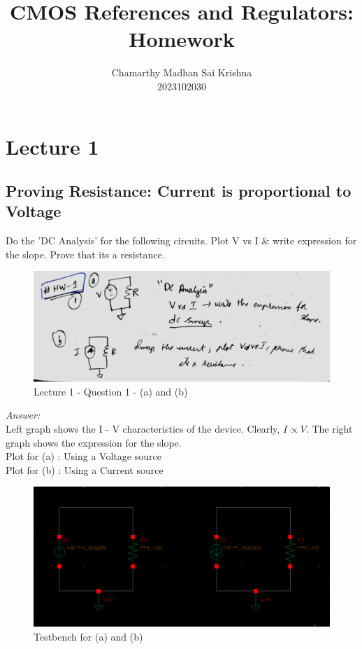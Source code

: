 \documentclass[a4paper]{article}
\title{\textbf{CMOS References and Regulators: Homework}}
\author{Chamarthy Madhan Sai Krishna\\2023102030}
\begin{document}
\maketitle

\tableofcontents

\section{Lecture 1}

\subsection{Proving Resistance: Current is proportional to Voltage}
Do the 'DC Analysis' for the following circuits. Plot V vs I $\&$ write expression for the slope. Prove that its a resistance.\\
\begin{figure}
    \centering
    \includegraphics[width=0.8\linewidth]{images/Lec_1_Q_1.jpeg}
    \caption{Lecture 1 - Question 1 - (a) and (b)}
\end{figure}
\textit{Answer: }\\
Left graph shows the I - V characteristics of the device. Clearly, $I \propto V$. The right graph shows the expression for the slope. \\
Plot for (a) : Using a Voltage source \\
Plot for (b) : Using a Current source

\begin{figure}[ht]
    \centering
    \includegraphics[width=1\linewidth]{images/Lec_1_Q_1_testbench.png}
    \caption{Testbench for (a) and (b)}
\end{figure}
\end{document}
